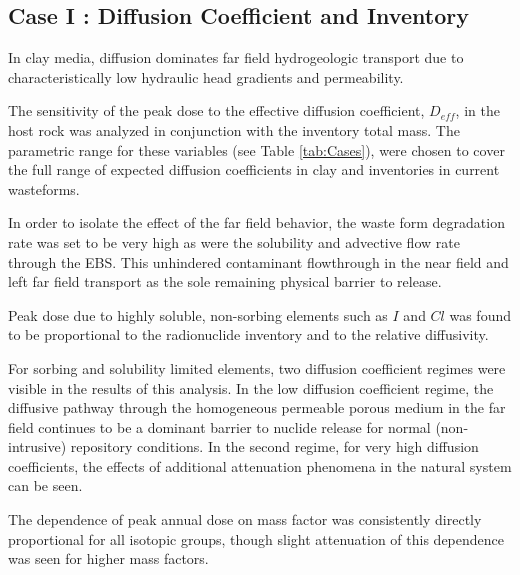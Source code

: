 
\subsection{Case I : Diffusion Coefficient and Inventory }
\label{sec:diffusivity}

In clay media, diffusion dominates far field hydrogeologic transport due to 
characteristically low hydraulic head gradients and permeability. 

The sensitivity of the peak dose to the effective diffusion coefficient, 
$D_{eff}$, in the host rock was analyzed in conjunction with the inventory 
total mass. The parametric range for these variables (see Table 
\ref{tab:Cases}), were chosen to cover the full range of expected diffusion 
coefficients in clay and inventories in current wasteforms.

In order to isolate the effect of the far field behavior, the waste form 
degradation rate was set to be very high as were the solubility and advective 
flow rate through the  \gls{EBS}. This unhindered contaminant flowthrough 
in the near field and left far field transport as the sole remaining physical 
barrier to release.

Peak dose due to highly soluble, non-sorbing elements such as $I$ and $Cl$ 
was found to be proportional to the radionuclide inventory and 
to the relative diffusivity. 

For sorbing and solubility limited elements,
two diffusion coefficient regimes were visible in the results of this analysis. 
In the low diffusion coefficient regime, the diffusive pathway through the 
homogeneous permeable porous medium in the far field continues to be a  dominant 
barrier to nuclide release for normal (non-intrusive) repository conditions.  
In the second regime, for very high diffusion coefficients, the effects of 
additional attenuation phenomena in the natural system can be seen. 

The dependence of peak annual dose on mass factor was consistently directly 
proportional for all isotopic groups, though slight attenuation of this 
dependence was seen for higher mass factors.
